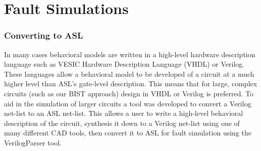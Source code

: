 \documentclass[12pt]{report}
\begin{document}
\chapter{Fault Simulations}

\subsection{Converting to ASL}
In many cases behavioral models are written in a high-level hardware description language such as VESIC Hardware Description Language (VHDL) or Verilog.  These languages allow a behavioral model to be developed of a circuit at a much higher level than ASL's gate-level description.  This means that for large, complex circuits (such as our BIST approach) design in VHDL or Verilog is preferred.  To aid in the simulation of larger circuits a tool was developed to convert a Verilog net-list to an ASL net-list.  This allows a user to write a high-level behavioral description of the circuit, synthesis it down to a Verilog net-list using one of many different CAD tools, then convert it to ASL for fault simulation using the VerilogParser tool.
\end{document}

